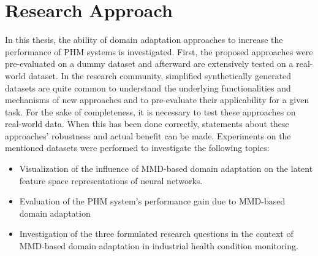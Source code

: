 \section{Research Approach}
In this thesis, the ability of domain adaptation approaches to increase the performance of PHM systems is investigated. First, the proposed approaches were pre-evaluated on a dummy dataset and afterward are extensively tested on a real-world dataset. In the research community, simplified synthetically generated datasets are quite common to understand the underlying functionalities and mechanisms of new approaches and to pre-evaluate their applicability for a given task. For the sake of completeness, it is necessary to test these approaches on real-world data. When this has been done correctly, statements about these approaches' robustness and actual benefit can be made. Experiments on the mentioned datasets were performed to investigate the following topics:
\begin{itemize}
    \item Visualization of the influence of MMD-based domain adaptation on the latent feature space representations of neural networks.
    \item Evaluation of the PHM system's performance gain due to MMD-based domain adaptation
    \item Investigation of the three formulated research questions in the context of MMD-based domain adaptation in industrial health condition monitoring.
\end{itemize}

